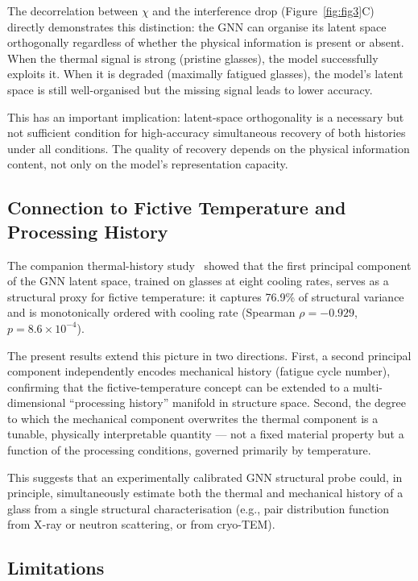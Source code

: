 \documentclass[12pt,a4paper]{article}
\newcommand{\xcontam}{\chi}
\begin{document}
The decorrelation between $\xcontam$ and the interference drop (Figure~\ref{fig:fig3}C) directly demonstrates this distinction: the GNN can organise its latent space orthogonally regardless of whether the physical information is present or absent.
When the thermal signal is strong (pristine glasses), the model successfully exploits it.
When it is degraded (maximally fatigued glasses), the model's latent space is still well-organised but the missing signal leads to lower accuracy.

This has an important implication: latent-space orthogonality is a necessary but not sufficient condition for high-accuracy simultaneous recovery of both histories under all conditions.
The quality of recovery depends on the physical information content, not only on the model's representation capacity.

\subsection{Connection to Fictive Temperature and Processing History}
\label{sec:fictive}

The companion thermal-history study~\cite{Singh2025Paper1} showed that the first principal component of the GNN latent space, trained on glasses at eight cooling rates, serves as a structural proxy for fictive temperature: it captures 76.9\% of structural variance and is monotonically ordered with cooling rate (Spearman $\rho = -0.929$, $p = 8.6 \times 10^{-4}$).

The present results extend this picture in two directions.
First, a second principal component independently encodes mechanical history (fatigue cycle number), confirming that the fictive-temperature concept can be extended to a multi-dimensional ``processing history'' manifold in structure space.
Second, the degree to which the mechanical component overwrites the thermal component is a tunable, physically interpretable quantity — not a fixed material property but a function of the processing conditions, governed primarily by temperature.

This suggests that an experimentally calibrated GNN structural probe could, in principle, simultaneously estimate both the thermal and mechanical history of a glass from a single structural characterisation (e.g., pair distribution function from X-ray or neutron scattering, or from cryo-TEM).

\subsection{Limitations}
\label{sec:limitations}
\end{document}
